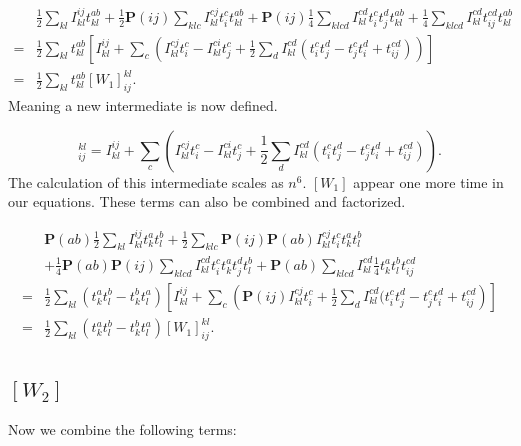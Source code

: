 \documentclass[a4paper,norsk,11pt,twoside]{report}
\begin{document}
\begin{align}
& 
\frac{1}{2} \sum_{kl} I_{kl}^{ij} t_{kl}^{ab} + \frac{1}{2} \textbf{P}(ij) \sum_{klc} I_{kl}^{cj} t_i^c t_{kl}^{ab} + \textbf{P}(ij) \frac{1}{4} \sum_{klcd} I_{kl}^{cd}  t_i^c t_j^d t_{kl}^{ab}
+ \frac{1}{4} \sum_{klcd} I_{kl}^{cd} t_{ij}^{cd} t_{kl}^{ab}
\nonumber \\ 
= &
\frac{1}{2} \sum_{kl} t_{kl}^{ab} \left[ I_{kl}^{ij} +  \sum_c \left(I_{kl}^{cj} t_i^c - I_{kl}^{ci} t_j^c + \frac{1}{2} \sum_{d}  I_{kl}^{cd} (t_i^c t_j^d - t_j^c t_i^d + t_{ij}^{cd})
 \right) \right]
\nonumber \\ 
= & \frac{1}{2} \sum_{kl} t_{kl}^{ab} [W_1]_{ij}^{kl} 
.
\end{align}
Meaning a new intermediate is now defined.

\begin{equation}
[W_1]^{kl}_{ij} = I_{kl}^{ij} +  \sum_c \left(I_{kl}^{cj} t_i^c - I_{kl}^{ci} t_j^c + \frac{1}{2} \sum_{d}  I_{kl}^{cd} (t_i^c t_j^d - t_j^c t_i^d + t_{ij}^{cd})
 \right) . \label{intermedw1}
\end{equation}
The calculation of this intermediate scales as $n^6$. $[W_1]$ appear one more time in our equations. These terms can also be combined and factorized.

\begin{align}
& \textbf{P}(ab) \frac{1}{2} \sum_{kl} I_{kl}^{ij} t_k^a t_l^b
+ \frac{1}{2} \sum_{klc} \textbf{P}(ij) \textbf{P}(ab) I_{kl}^{cj} t_i^c t_k^a t_l^b 
\nonumber \\ &
+ \frac{1}{4} \textbf{P}(ab) \textbf{P}(ij) \sum_{klcd} I_{kl}^{cd} t_i^c t_k^a t_j^d t_l^b
+ \textbf{P}(ab) \sum_{klcd} I_{kl}^{cd} \frac{1}{4} t_k^a t_l^b t_{ij}^{cd}
\nonumber \\ 
= &
\frac{1}{2} \sum_{kl} (t_k^a t_l^b - t_k^b t_l^a) \left[ I_{kl}^{ij} + \sum_c \left( \textbf{P}(ij) I_{kl}^{cj} t_i^c +
\frac{1}{2} \sum_d I_{kl}^{cd} ( t_i^c t_j^d - t_j^c t_i^d + t_{ij}^{cd}
\right) \right] \nonumber \\ 
= &
\frac{1}{2} \sum_{kl} (t_k^a t_l^b - t_k^b t_l^a) [W_1]_{ij}^{kl} .
\end{align}

\subsection{$[W_2]$}
Now we combine the following terms:
\end{document}
